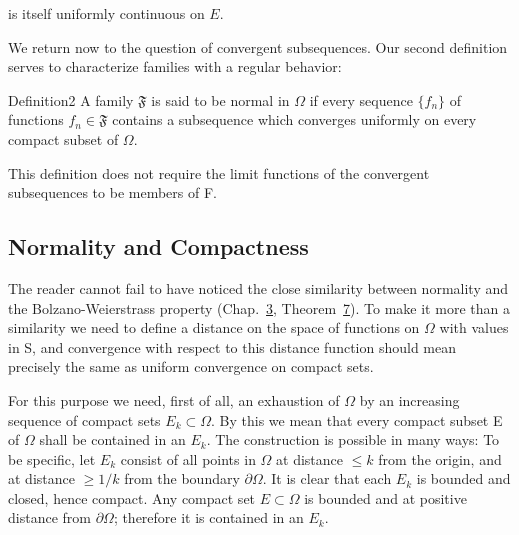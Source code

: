 is itself uniformly continuous on $E$.

We return now to the question of convergent subsequences. Our second definition serves to characterize families with a regular behavior:

\begin{originalstatement}{Definition}{2}\label{def:5.2}
A family $\mathfrak{F}$ is said to be normal in $\Omega$ if every sequence $\{f_{n}\}$ of functions $f_{n} \in \mathfrak{F}$ contains a subsequence which converges uniformly on every compact subset of $\Omega$.
\end{originalstatement}
This definition does not require the limit functions of the convergent subsequences to be members of F.

\setcounter{section}{5}\setcounter{subsection}{1}\subsection{Normality and Compactness}\label{sec:5.5.2}
The reader cannot fail to have noticed the close similarity between normality and the Bolzano-Weierstrass property (Chap.~\hyperref[chap:3]{3}, Theorem~\hyperref[thm:3.7]{7}). To make it more than a similarity we need to define a distance on the space of functions on $\Omega$ with values in S, and convergence with respect to this distance function should mean precisely the same as uniform convergence on compact sets.

For this purpose we need, first of all, an exhaustion of $\Omega$ by an increasing sequence of compact sets $E_{k} \subset \Omega$. By this we mean that every compact subset E of $\Omega$ shall be contained in an $E_{k}$. The construction is possible in many ways: To be specific, let $E_{k}$ consist of all points in $\Omega$ at distance $\leq k$ from the origin, and at distance $\geq 1/k$ from the boundary $\partial\Omega$. It is clear that each $E_{k}$ is bounded and closed, hence compact. Any compact set $E \subset \Omega$ is bounded and at positive distance from $\partial\Omega$; therefore it is contained in an $E_{k}$.

